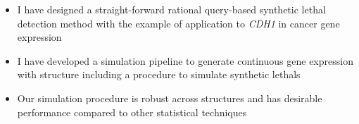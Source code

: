      \begin{itemize}
      \item I have designed a straight-forward rational query-based \gls{synthetic lethal} detection method with the example of application to \textit{CDH1} in cancer \gls{gene expression}
      
      \bigskip
      
      \item I have developed a simulation pipeline to generate continuous \gls{gene expression} with  structure including a procedure to simulate \glspl{synthetic lethal} 
      
      \bigskip
      
      \item Our simulation procedure is robust across  structures and has desirable performance compared to other statistical techniques 
      \end{itemize}
 \fi